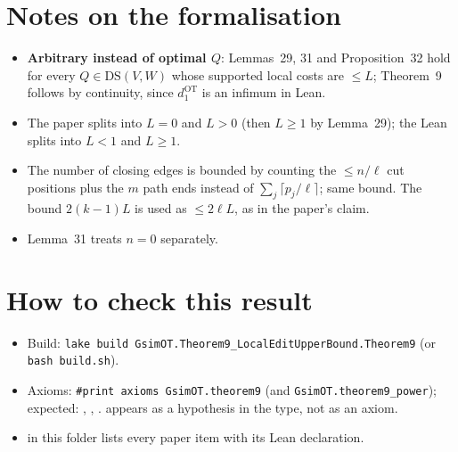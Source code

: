 \section{Notes on the formalisation}
\begin{itemize}
\item \textbf{Arbitrary instead of optimal $Q$}: Lemmas~29, 31 and Proposition~32 hold for every
  $Q\in\mathrm{DS}(V,W)$ whose supported local costs are $\le L$; Theorem~9 follows by continuity, since
  $d_1^{\mathrm{OT}}$ is an infimum in Lean.
\item The paper splits into $L=0$ and $L>0$ (then $L\ge1$ by Lemma~29); the Lean splits into $L<1$ and $L\ge1$.
\item The number of closing edges is bounded by counting the $\le n/\ell$ cut positions plus the $m$ path ends
  instead of $\sum_j\lceil p_j/\ell\rceil$; same bound. The bound $2(k-1)L$ is used as $\le2\ell L$, as in the
  paper's claim.
\item Lemma~31 treats $n=0$ separately.
\end{itemize}

\section{How to check this result}
\begin{itemize}
\item Build: \texttt{lake build GsimOT.Theorem9\_LocalEditUpperBound.Theorem9} (or \texttt{bash build.sh}).
\item Axioms: \texttt{\#print axioms GsimOT.theorem9} (and \texttt{GsimOT.theorem9\_power}); expected:
  , , .  appears as a hypothesis in the
  type, not as an axiom.
\item {} in this folder lists every paper item with its Lean declaration.
\end{itemize}

